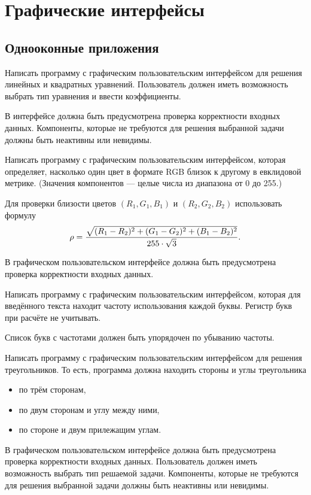 \section{Графические интерфейсы}

\subsection{Однооконные приложения}

\task Написать программу с графическим пользовательским интерфейсом
для решения линейных и квадратных уравнений. Пользователь должен иметь
возможность выбрать тип уравнения и ввести коэффициенты.

В интерфейсе должна быть предусмотрена проверка корректности входных
данных. Компоненты, которые не требуются для решения выбранной задачи
должны быть неактивны или невидимы.

\task Написать программу с графическим пользовательским интерфейсом,
которая определяет, насколько один цвет в формате RGB близок к другому
в евклидовой метрике. (Значения компонентов — целые числа из диапазона
от 0 до 255.)

Для проверки близости цветов $(R_1, G_1, B_1)$ и $(R_2, G_2, B_2)$
использовать формулу
\[
\rho = {\sqrt{(R_1-R_2)^2 + (G_1-G_2)^2 + (B_1-B_2)^2} \over 255 \cdot \sqrt{3}}.
\]

В графическом пользовательском интерфейсе должна быть предусмотрена
проверка корректности входных данных.

\task Написать программу с графическим пользовательским интерфейсом,
которая для введённого текста находит частоту использования каждой
буквы. Регистр букв при расчёте не учитывать.

Список букв с частотами должен быть упорядочен по убыванию частоты.

\task Написать программу с графическим пользовательским интерфейсом
для решения треугольников. То есть, программа должна находить стороны
и углы треугольника
\begin{itemize}
\item по трём сторонам,
\item по двум сторонам и углу между ними,
\item по стороне и двум прилежащим углам.
\end{itemize}

В графическом пользовательском интерфейсе должна быть предусмотрена
проверка корректности входных данных. Пользователь должен иметь
возможность выбрать тип решаемой задачи. Компоненты, которые не
требуются для решения выбранной задачи должны быть неактивны или
невидимы.

